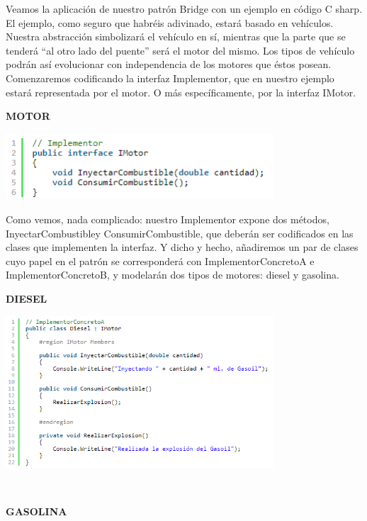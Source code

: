 \begin{flushleft}
\begin{itemize}
Veamos la aplicación de nuestro patrón Bridge con un ejemplo en código C sharp. El ejemplo, como seguro que habréis adivinado, estará basado en vehículos. Nuestra abstracción simbolizará el vehículo en sí, mientras que la parte que se tenderá “al otro lado del puente” será el motor del mismo. Los tipos de vehículo podrán así evolucionar con independencia de los motores que éstos posean.
Comenzaremos codificando la interfaz Implementor, que en nuestro ejemplo estará representada por el motor. O más específicamente, por la interfaz IMotor.
\begin{center}
\textbf {MOTOR}
	\end{center}

\begin{center}
	\includegraphics[width=10cm]{./Imagenes/bridge4} 
	\end{center}

Como vemos, nada complicado: nuestro Implementor expone dos métodos, InyectarCombustibley ConsumirCombustible, que deberán ser codificados en las clases que implementen la interfaz. Y dicho y hecho, añadiremos un par de clases cuyo papel en el patrón se corresponderá con ImplementorConcretoA e ImplementorConcretoB, y modelarán dos tipos de motores: diesel y gasolina.
\textbf{}\\

\begin{center}
\textbf {DIESEL}
	\end{center}

\begin{center}
	\includegraphics[width=10cm]{./Imagenes/bridge5} 
	\end{center}

\textbf{}\\
\begin{center}
\textbf {GASOLINA}
	\end{center}


\end{itemize}
\end{flushleft}
